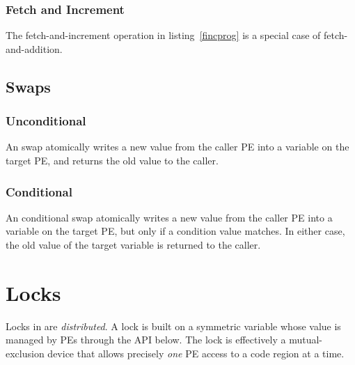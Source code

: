 \subsubsection{Fetch and Increment}

The fetch-and-increment operation in listing~\ref{fincprog} is a
special case of fetch-and-addition.

\begin{minipage}{\linewidth}
\vspace{0.1in}
\vspace{0.1in}
\end{minipage}

\subsection{Swaps}

\subsubsection{Unconditional}

An \openshmem swap atomically writes a new value from the caller PE
into a variable on the target PE, and returns the old value to the
caller.


\subsubsection{Conditional}

An \openshmem conditional swap atomically writes a new value from the
caller PE into a variable on the target PE, but only if a condition
value matches.  In either case, the old value of the target variable
is returned to the caller.


\section{Locks}

Locks in \openshmem are \emph{distributed}.  A lock is built on a
symmetric variable whose value is managed by PEs through the API
below.  The \openshmem lock is effectively a mutual-exclusion device
that allows precisely \emph{one} PE access to a code region at a time.

